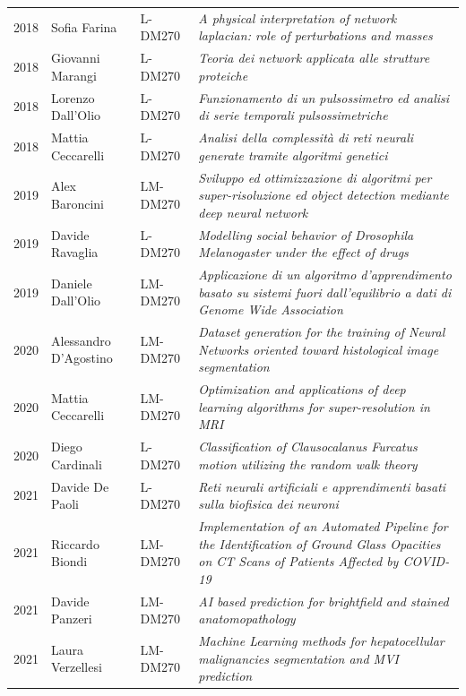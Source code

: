 \documentclass[a4paper,11pt]{article}
\begin{document}
\begin{tabular}{lllp{9cm}}

  2018 & Sofia Farina          & L-DM270  & \emph{A physical interpretation of network laplacian: role of perturbations and masses}\\
  2018 & Giovanni Marangi      & L-DM270  & \emph{Teoria dei network applicata alle strutture proteiche}\\
  2018 & Lorenzo Dall'Olio     & L-DM270  & \emph{Funzionamento di un pulsossimetro ed analisi di serie temporali pulsossimetriche}\\
  2018 & Mattia Ceccarelli     & L-DM270  & \emph{Analisi della complessità di reti neurali generate tramite algoritmi genetici}\\
  2019 & Alex Baroncini        & LM-DM270 & \emph{Sviluppo ed ottimizzazione di algoritmi per super-risoluzione ed object detection mediante deep neural network}\\
  2019 & Davide Ravaglia       & L-DM270  & \emph{Modelling social behavior of Drosophila Melanogaster under the effect of drugs}\\
  2019 & Daniele Dall'Olio     & LM-DM270 & \emph{Applicazione di un algoritmo d’apprendimento basato su sistemi fuori dall’equilibrio a dati di Genome Wide Association}\\
  2020 & Alessandro D'Agostino & LM-DM270 & \emph{Dataset generation for the training of Neural Networks oriented toward histological image segmentation}\\
  2020 & Mattia Ceccarelli     & LM-DM270 & \emph{Optimization and applications of deep learning algorithms for super-resolution in MRI}\\
  2020 & Diego Cardinali       & L-DM270  & \emph{Classification of Clausocalanus Furcatus motion utilizing the random walk theory}\\
  2021 & Davide De Paoli       & L-DM270  & \emph{Reti neurali artificiali e apprendimenti basati sulla biofisica dei neuroni}\\
  2021 & Riccardo Biondi       & LM-DM270 & \emph{Implementation of an Automated Pipeline for the Identification of Ground Glass Opacities on CT Scans of Patients Affected by COVID-19}\\
  2021 & Davide Panzeri        & LM-DM270 & \emph{AI based prediction for brightfield and stained anatomopathology}\\
  2021 & Laura Verzellesi      & LM-DM270 & \emph{Machine Learning methods for hepatocellular malignancies segmentation and MVI prediction}\\

\end{tabular}
\end{document}
